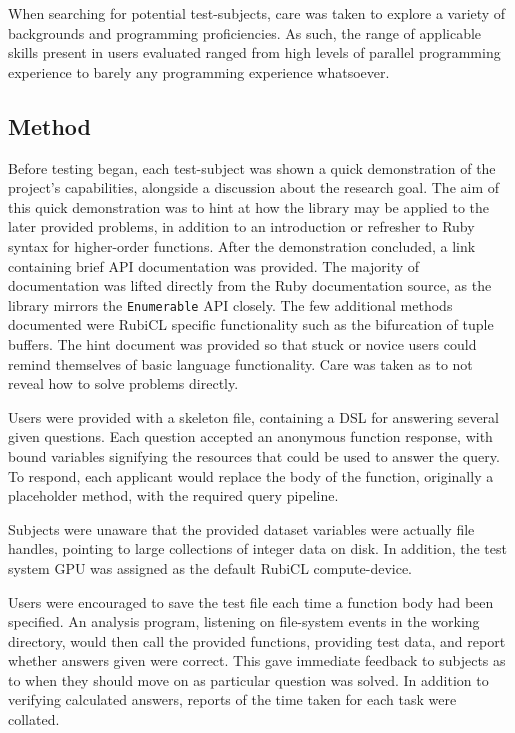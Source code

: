 When searching for potential test-subjects, care was taken to explore a variety of backgrounds and programming proficiencies.
As such, the range of applicable skills present in users evaluated ranged from high levels of parallel programming experience to barely any programming experience whatsoever.

\subsection{Method}
Before testing began, each test-subject was shown a quick demonstration of the project's capabilities, alongside a discussion about the research goal.
The aim of this quick demonstration was to hint at how the library may be applied to the later provided problems, in addition to an introduction or refresher to Ruby syntax for higher-order functions. After the demonstration concluded, a link\cite{user_test_hints} containing brief \ac{API} documentation was provided. The majority of documentation was lifted directly from the Ruby documentation source, as the library mirrors the \verb|Enumerable| \ac{API} closely. The few additional methods documented were RubiCL specific functionality such as the bifurcation of tuple buffers. The hint document was provided so that stuck or novice users could remind themselves of basic language functionality. Care was taken as to not reveal how to solve problems directly.

Users were provided with a skeleton file, containing a DSL for answering several given questions. Each question accepted an anonymous function response, with bound variables signifying the resources that could be used to answer the query. To respond, each applicant would replace the body of the function, originally a placeholder method, with the required query pipeline.

Subjects were unaware that the provided dataset variables were actually file handles, pointing to large collections of integer data on disk. In addition, the test system \ac{GPU} was assigned as the default RubiCL compute-device.

Users were encouraged to save the test file each time a function body had been specified. An analysis program, listening on file-system events in the working directory, would then call the provided functions, providing test data, and report whether answers given were correct. This gave immediate feedback to subjects as to when they should move on as particular question was solved. In addition to verifying calculated answers, reports of the time taken for each task were collated.

